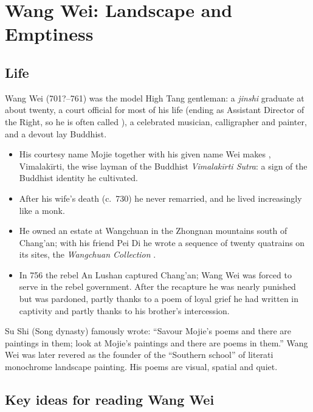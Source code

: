 \chapter{Wang Wei: Landscape and Emptiness}

\section{Life}

Wang Wei  (701?--761) was the model High Tang gentleman: a \emph{jinshi}
graduate at about twenty, a court official for most of his life (ending as Assistant
Director of the Right, so he is often called ), a celebrated musician,
calligrapher and painter, and a devout lay Buddhist.

\begin{itemize}
  \item His courtesy name Mojie  together with his given name Wei  makes
        , Vimalakīrti, the wise layman of the Buddhist \emph{Vimalakīrti
        Sutra}: a sign of the Buddhist identity he cultivated.
  \item After his wife's death (c.\ 730) he never remarried, and he lived increasingly like a
        monk.
  \item He owned an estate at Wangchuan  in the Zhongnan mountains south of
        Chang'an; with his friend Pei Di he wrote a sequence of twenty quatrains on its
        sites, the \emph{Wangchuan Collection} .
  \item In 756 the rebel An Lushan captured Chang'an; Wang Wei was forced to serve in the
        rebel government. After the recapture he was nearly punished but was pardoned,
        partly thanks to a poem of loyal grief he had written in captivity and partly
        thanks to his brother's intercession.
\end{itemize}

\begin{important}
Su Shi (Song dynasty) famously wrote: 
``Savour Mojie's poems and there are paintings in them; look at Mojie's paintings and there
are poems in them.'' Wang Wei was later revered as the founder of the ``Southern school''
of literati monochrome landscape painting. His poems are visual, spatial and quiet.
\end{important}

\section{Key ideas for reading Wang Wei}

